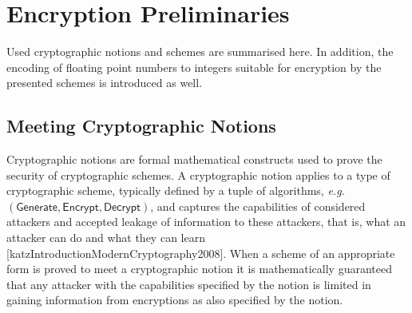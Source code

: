 % 
%                                                                                                      
%                                                                                                      
%                                                                                                      
% 

\section{Encryption Preliminaries}\label{sec:prelims:crypto_prelims}
Used cryptographic notions and schemes are summarised here. In addition, the encoding of floating point numbers to integers suitable for encryption by the presented schemes is introduced as well.

% 
% 

\subsection{Meeting Cryptographic Notions}\label{subsec:prelims:crypto_notions}
Cryptographic notions are formal mathematical constructs used to prove the security of cryptographic schemes. A cryptographic notion applies to a type of cryptographic scheme, typically defined by a tuple of algorithms, \textit{e.g.} $(\mathsf{Generate},\mathsf{Encrypt},\mathsf{Decrypt})$, and captures the capabilities of considered attackers and accepted leakage of information to these attackers, that is, what an attacker can do and what they can learn [katzIntroductionModernCryptography2008]. When a scheme of an appropriate form is proved to meet a cryptographic notion it is mathematically guaranteed that any attacker with the capabilities specified by the notion is limited in gaining information from encryptions as also specified by the notion.

